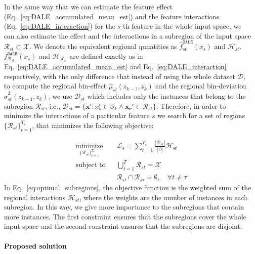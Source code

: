 \documentclass[12pt]{article}
\newcommand{\xb}{\mathbf{x}}
\newcommand{\xc}{\mathbf{x_c}}
\begin{document}
In the same way that we can estimate the feature effect (Eq.~\eqref{eq:DALE_accumulated_mean_est}) and
the feature interactions (Eq.~\eqref{eq:DALE_interaction}) for the $s$-th feature in the whole input space,
we can also estimate the effect and the interactions in a subregion of the input space \(\mathcal{R}_{st} \subset \mathcal{X}\).
We denote the equivalent regional qunatities as $\hat{f}^{\mathtt{DALE}}_{st}(x_s)$ and $\mathcal{H}_{st}$.
$f^{\mathtt{DALE}}_{\mathcal{R}_{st}}(x_s)$ and $\mathcal{H}_{\mathcal{R}_{st}}$ are defined exactly as in
Eq.~\eqref{eq:DALE_accumulated_mean_est} and Eq.~\eqref{eq:DALE_interaction} respectively,
with the only difference that instead of using the whole dataset \(\mathcal{D}\), to compute the regional bin-effect $\hat{\mu}_{st}(z_{k-1}, z_k)$
and the regional bin-deviation $\hat{\sigma}_{st}^2(z_{k-1}, z_k)$,
we use $\mathcal{D}_{st}$ which includes only the instances that belong to the subregion \(\mathcal{R}_{st}\),
i.e., $\mathcal{D}_{st} = \{\xb^i: x_s^i \in \mathcal{S}_k \land \xc^i \in \mathcal{R}_{st}\}$.
Therefore, in order to minimize the interactions of a particular feature $s$ we search for a set of regions \(\{\mathcal{R}_{st}\}_{t=1}^{T_s}\),
that minimizes the following objective:

\begin{equation}
  \label{eq:optimal_subregions}
  \begin{aligned}
    & \underset{\{\mathcal{R}_{st}\}_{t=1}^{T_s}}{\text{minimize}}
    & & \mathcal{L}_s = \sum_{t=1}^{T_s} \frac{| \mathcal{D}_{st} |}{|\mathcal{D}|} \mathcal{H}_{st} \\
    & \text{subject to}
    & & \bigcup_{t=1}^{T} \mathcal{R}_{st} = \mathcal{X} \\
    & & & \mathcal{R}_{st} \cap \mathcal{R}_{s\tau} = \emptyset, \quad \forall t \neq \tau
  \end{aligned}
\end{equation}
%
In Eq.~\eqref{eq:optimal_subregions}, the objective function is the weighted sum of the regional interactions $\mathcal{H}_{st}$,
where the weights are the number of instances in each subregion.
In this way, we give more importance to the subregions that contain more instances.
The first constraint ensures that the subregions cover the whole input space and the second constraint ensures that the subregions are disjoint.

\paragraph{Proposed solution}
\end{document}
